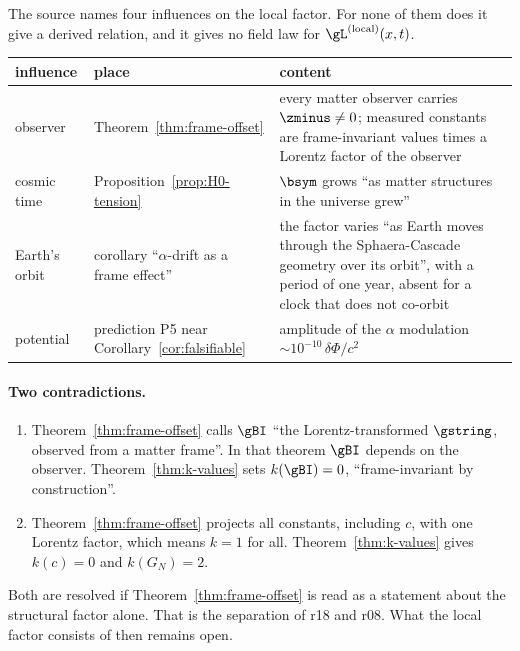The source names four influences on the local factor.  For none of them does it give a derived relation, and it gives
no field law for \(\gL^{(\mathrm{local})}(x,t)\).
\begin{center}
\small
\begin{tabular}{@{}>{\raggedright\arraybackslash}p{}>{\raggedright\arraybackslash}p{}>{\raggedright\arraybackslash}p{}@{}}
\toprule
influence & place & content\\
\midrule
observer & Theorem~\ref{thm:frame-offset} & every matter observer carries \(\zminus\neq0\); measured constants are frame-invariant values times a Lorentz factor of the observer\\
cosmic time & Proposition~\ref{prop:H0-tension} & \(\bsym\) grows ``as matter structures in the universe grew''\\
Earth's orbit & corollary ``\(\alpha\)-drift as a frame effect'' & the factor varies ``as Earth moves through the Sphaera-Cascade geometry over its orbit'', with a period of one year, absent for a clock that does not co-orbit\\
potential & prediction P5 near Corollary~\ref{cor:falsifiable} & amplitude of the \(\alpha\) modulation \(\sim10^{-10}\,\delta\Phi/c^2\)\\
\bottomrule
\end{tabular}
\end{center}

\paragraph{Two contradictions.}
\begin{enumerate}[leftmargin=2em]
\item Theorem~\ref{thm:frame-offset} calls \(\gBI\) ``the Lorentz-transformed \(\gstring\), observed from a matter frame''.
In that theorem \(\gBI\) depends on the observer.  Theorem~\ref{thm:k-values} sets \(k(\gBI)=0\), ``frame-invariant by
construction''.
\item Theorem~\ref{thm:frame-offset} projects all constants, including \(c\), with one Lorentz factor, which means
\(k=1\) for all.  Theorem~\ref{thm:k-values} gives \(k(c)=0\) and \(k(G_N)=2\).
\end{enumerate}
Both are resolved if Theorem~\ref{thm:frame-offset} is read as a statement about the structural factor alone.  That is the
separation of r18 and r08.  What the local factor consists of then remains open.

